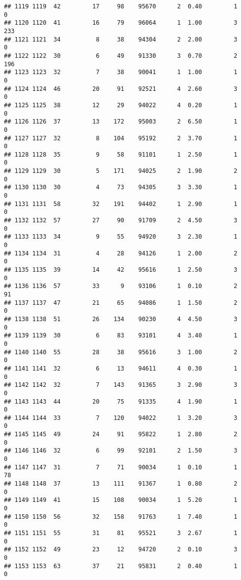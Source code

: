 \documentclass[
]{article}
\begin{document}
\begin{verbatim}
## 1119 1119  42         17     98    95670      2  0.40         1        0
## 1120 1120  41         16     79    96064      1  1.00         3      233
## 1121 1121  34          8     38    94304      2  2.00         3        0
## 1122 1122  30          6     49    91330      3  0.70         2      196
## 1123 1123  32          7     38    90041      1  1.00         1        0
## 1124 1124  46         20     91    92521      4  2.60         3        0
## 1125 1125  38         12     29    94022      4  0.20         1        0
## 1126 1126  37         13    172    95003      2  6.50         1        0
## 1127 1127  32          8    104    95192      2  3.70         1        0
## 1128 1128  35          9     58    91101      1  2.50         1        0
## 1129 1129  30          5    171    94025      2  1.90         2        0
## 1130 1130  30          4     73    94305      3  3.30         1        0
## 1131 1131  58         32    191    94402      1  2.90         1        0
## 1132 1132  57         27     90    91709      2  4.50         3        0
## 1133 1133  34          9     55    94920      3  2.30         1        0
## 1134 1134  31          4     28    94126      1  2.00         2        0
## 1135 1135  39         14     42    95616      1  2.50         3        0
## 1136 1136  57         33      9    93106      1  0.10         2       91
## 1137 1137  47         21     65    94086      1  1.50         2        0
## 1138 1138  51         26    134    90230      4  4.50         3        0
## 1139 1139  30          6     83    93101      4  3.40         1        0
## 1140 1140  55         28     38    95616      3  1.00         2        0
## 1141 1141  32          6     13    94611      4  0.30         1        0
## 1142 1142  32          7    143    91365      3  2.90         3        0
## 1143 1143  44         20     75    91335      4  1.90         1        0
## 1144 1144  33          7    120    94022      1  3.20         3        0
## 1145 1145  49         24     91    95822      1  2.80         2        0
## 1146 1146  32          6     99    92101      2  1.50         3        0
## 1147 1147  31          7     71    90034      1  0.10         1       78
## 1148 1148  37         13    111    91367      1  0.80         2        0
## 1149 1149  41         15    108    90034      1  5.20         1        0
## 1150 1150  56         32    158    91763      1  7.40         1        0
## 1151 1151  55         31     81    95521      3  2.67         1        0
## 1152 1152  49         23     12    94720      2  0.10         3        0
## 1153 1153  63         37     21    95831      2  0.40         1        0

\end{verbatim}
\end{document}
